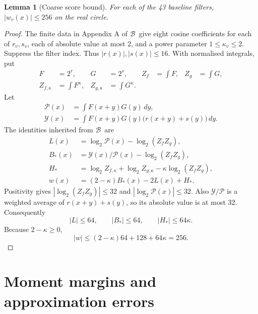 \documentclass[11pt,a4paper]{article}
\newtheorem{lemma}[theorem]{Lemma}
\theoremstyle{remark}
\newcommand{\Base}{\ensuremath{\mathcal{B}}}
\newcommand{\logtwo}{\log_2}
\begin{document}
\begin{lemma}[Coarse score bound]
\label{lem:score}
For each of the 43 baseline filters, $|w_v(x)|\le256$ on the real circle.
\end{lemma}
\begin{proof}
The finite data in Appendix A of \Base\ give eight cosine coefficients
for each of $r_v,s_v$, each of absolute value at most $2$, and a power
parameter $1\le\kappa_v\le2$. Suppress the filter index. Thus
$|r(x)|,|s(x)|\le16$. With normalised integrals, put
\begin{align*}
 F&=2^r,& G&=2^s,& Z_f&=\int F,& Z_g&=\int G,\\
 Z_{f,\kappa}&=\int F^\kappa,&
 Z_{g,\kappa}&=\int G^\kappa.
\end{align*}
Let
\begin{align*}
 \mathcal P(x)&=\int F(x+y)G(y)\,dy,\\
 \mathcal Y(x)&=\int F(x+y)G(y)\bigl(r(x+y)+s(y)\bigr)\,dy.
\end{align*}
The identities inherited from \Base\ are
\begin{align*}
 L(x)&=\logtwo\mathcal P(x)-\logtwo(Z_fZ_g),\\
 B_*(x)&=\mathcal Y(x)/\mathcal P(x)-\logtwo(Z_fZ_g),\\
 H_*&=\logtwo Z_{f,\kappa}+\logtwo Z_{g,\kappa}
       -\kappa\logtwo(Z_fZ_g),\\
 w(x)&=(2-\kappa)B_*(x)-2L(x)+H_*.
\end{align*}
Positivity gives $|\logtwo(Z_fZ_g)|\le32$ and
$|\logtwo\mathcal P(x)|\le32$. Also $\mathcal Y/\mathcal P$ is a
weighted average of $r(x+y)+s(y)$, so its absolute value is at most
$32$. Consequently
\[
 |L|\le64,\qquad |B_*|\le64,\qquad |H_*|\le64\kappa.
\]
Because $2-\kappa\ge0$,
\[
 |w|\le(2-\kappa)64+128+64\kappa=256.
\]
\end{proof}

\section{Moment margins and approximation errors}
\label{sec:error}
\end{document}
